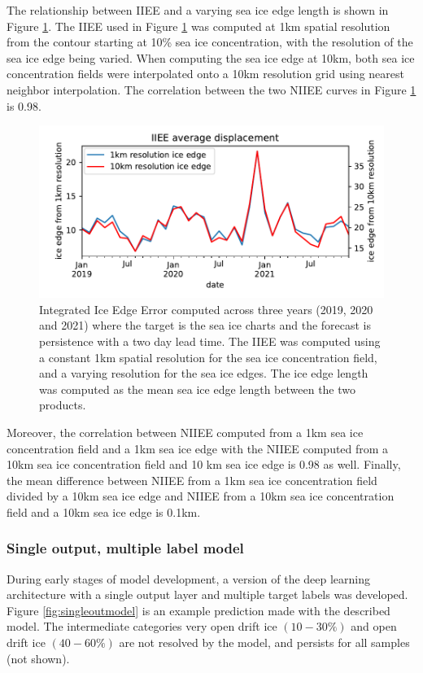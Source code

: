 \documentclass[../main/thesis]{subfiles}
\begin{document}
The relationship between IIEE and a varying sea ice edge length is shown in Figure \ref{fig:iiee_1km_10km}. The IIEE used in Figure \ref{fig:iiee_1km_10km} was computed at 1km spatial resolution from the contour starting at 10\% sea ice concentration, with the resolution of the sea ice edge being varied. When computing the sea ice edge at 10km, both sea ice concentration fields were interpolated onto a 10km resolution grid using nearest neighbor interpolation. The correlation between the two NIIEE curves in Figure \ref{fig:iiee_1km_10km} is 0.98.

\begin{figure}[h]
    \centering
    \includegraphics[width=1.\textwidth]{normalized_iiee}
    \caption{\label{fig:iiee_1km_10km}Integrated Ice Edge Error computed across three years (2019, 2020 and 2021) where the target is the sea ice charts and the forecast is persistence with a two day lead time. The IIEE was computed using a constant 1km spatial resolution for the sea ice concentration field, and a varying resolution for the sea ice edges. The ice edge length was computed as the mean sea ice edge length between the two products.}
\end{figure}

Moreover, the correlation between NIIEE computed from a 1km sea ice concentration field and a 1km sea ice edge with the NIIEE computed from a 10km sea ice concentration field and 10 km sea ice edge is 0.98 as well. Finally, the mean difference between NIIEE from a 1km sea ice concentration field divided by a 10km sea ice edge and NIIEE from a 10km sea ice concentration field and a 10km sea ice edge is 0.1km.  

\subsubsection{Single output, multiple label model}
\label{sec:singleoutputmodel}
During early stages of model development, a version of the deep learning architecture with a single output layer and multiple target labels was developed. Figure \ref{fig:singleoutmodel} is an example prediction made with the described model. The intermediate categories very open drift ice $(10 - 30\%)$ and open drift ice $(40 - 60\%)$ are not resolved by the model, and persists for all samples (not shown). 
\end{document}
